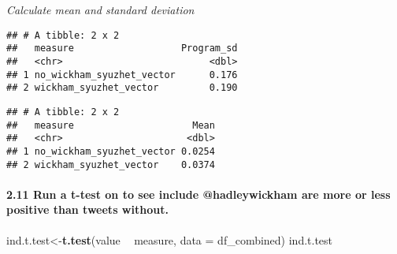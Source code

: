 \documentclass[]{article}
\newenvironment{Shaded}{\begin{snugshade}}{\end{snugshade}}
\newcommand{\DataTypeTok}[1]{\textcolor[rgb]{0.13,0.29,0.53}{#1}}
\newcommand{\KeywordTok}[1]{\textcolor[rgb]{0.13,0.29,0.53}{\textbf{#1}}}
\newcommand{\NormalTok}[1]{#1}
\newcommand{\OperatorTok}[1]{\textcolor[rgb]{0.81,0.36,0.00}{\textbf{#1}}}
\newcommand{\StringTok}[1]{\textcolor[rgb]{0.31,0.60,0.02}{#1}}
\let\oldparagraph\paragraph
\renewcommand{\paragraph}[1]{\oldparagraph{#1}\mbox{}}
\begin{document}
\emph{Calculate mean and standard deviation}

\begin{Shaded}
\end{Shaded}

\begin{verbatim}
## # A tibble: 2 x 2
##   measure                   Program_sd
##   <chr>                          <dbl>
## 1 no_wickham_syuzhet_vector      0.176
## 2 wickham_syuzhet_vector         0.190
\end{verbatim}

\begin{Shaded}
\end{Shaded}

\begin{verbatim}
## # A tibble: 2 x 2
##   measure                     Mean
##   <chr>                      <dbl>
## 1 no_wickham_syuzhet_vector 0.0254
## 2 wickham_syuzhet_vector    0.0374
\end{verbatim}

\hypertarget{run-a-t-test-on-to-see-include-hadleywickham-are-more-or-less-positive-than-tweets-without.}{%
\paragraph{2.11 Run a t-test on to see include @hadleywickham are more
or less positive than tweets
without.}\label{run-a-t-test-on-to-see-include-hadleywickham-are-more-or-less-positive-than-tweets-without.}}

\begin{Shaded}
\begin{Highlighting}[]
\NormalTok{ind.t.test<-}\KeywordTok{t.test}\NormalTok{(value }\OperatorTok{~}\StringTok{ }\NormalTok{measure, }\DataTypeTok{data =}\NormalTok{ df_combined)}
\NormalTok{ind.t.test}
\end{Highlighting}
\end{Shaded}
\end{document}
